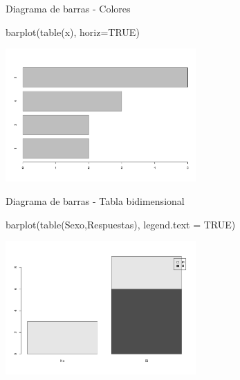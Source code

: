 \documentclass[
  ignorenonframetext,
  aspectratio=169]{beamer}
\newenvironment{Shaded}{\begin{snugshade}}{\end{snugshade}}
\newcommand{\AttributeTok}[1]{\textcolor[rgb]{0.77,0.63,0.00}{#1}}
\newcommand{\ConstantTok}[1]{\textcolor[rgb]{0.00,0.00,0.00}{#1}}
\newcommand{\FunctionTok}[1]{\textcolor[rgb]{0.00,0.00,0.00}{#1}}
\newcommand{\NormalTok}[1]{#1}
\begin{document}
\begin{frame}[fragile]{Diagrama de barras - Colores}
\protect\hypertarget{diagrama-de-barras---colores-1}{}
\begin{Shaded}
\begin{Highlighting}[]
\FunctionTok{barplot}\NormalTok{(}\FunctionTok{table}\NormalTok{(x), }\AttributeTok{horiz=}\ConstantTok{TRUE}\NormalTok{)}
\end{Highlighting}
\end{Shaded}

\begin{center}\includegraphics[width=275px]{Hora3_files/figure-beamer/unnamed-chunk-35-1} \end{center}
\end{frame}

\begin{frame}[fragile]{Diagrama de barras - Tabla bidimensional}
\protect\hypertarget{diagrama-de-barras---tabla-bidimensional}{}
\begin{Shaded}
\begin{Highlighting}[]
\FunctionTok{barplot}\NormalTok{(}\FunctionTok{table}\NormalTok{(Sexo,Respuestas), }\AttributeTok{legend.text =} \ConstantTok{TRUE}\NormalTok{)}
\end{Highlighting}
\end{Shaded}

\begin{center}\includegraphics[width=275px]{Hora3_files/figure-beamer/unnamed-chunk-36-1} \end{center}
\end{frame}
\end{document}
